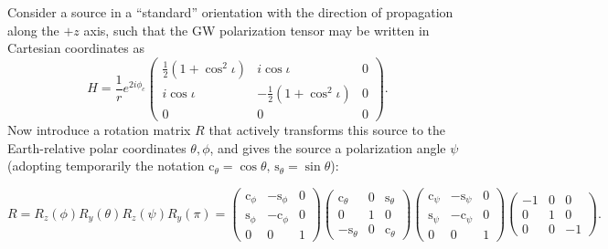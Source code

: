 \documentclass[amsmath,amssymb,aps,prx,reprint,nopreprintnumbers,nofootinbib,showpacs]{revtex4-1}
\begin{document}
Consider a source in a ``standard'' orientation with the direction of propagation along the $+z$ axis, such that the \ac{GW} polarization tensor may be written in Cartesian coordinates as
%
\begin{equation}
    H = \frac{1}{r} e^{2 i \phi_c} \left(
    \begin{array}{ccc}
        \frac{1}{2}(1 + \cos^2 \iota) & i \cos\iota & 0 \\
        i \cos\iota & -\frac{1}{2}(1 + \cos^2 \iota) & 0 \\
        0 & 0 & 0
    \end{array}
    \right).
\end{equation}
%
Now introduce a rotation matrix $R$ that actively transforms this source to the Earth-relative polar coordinates $\theta, \phi$, and gives the source a polarization angle $\psi$ (adopting temporarily the notation $\mathrm{c}_\theta = \cos\theta,\,\mathrm{s}_\theta = \sin\theta$):
%
\begin{widetext}
\begin{equation}
    R = R_z(\phi) R_y(\theta) R_z(\psi) R_y(\pi)
    = \left(
        \begin{array}{ccc}
            \mathrm{c}_\phi & -\mathrm{s}_\phi & 0 \\
            \mathrm{s}_\phi & -\mathrm{c}_\phi & 0 \\
            0 & 0 & 1
        \end{array}
    \right)
    \left(
        \begin{array}{ccc}
            \mathrm{c}_\theta & 0 & \mathrm{s}_\theta \\
            0 & 1 & 0 \\
            -\mathrm{s}_\theta & 0 & \mathrm{c}_\theta
        \end{array}
    \right)
    \left(
        \begin{array}{ccc}
            \mathrm{c}_\psi & -\mathrm{s}_\psi & 0 \\
            \mathrm{s}_\psi & -\mathrm{c}_\psi & 0 \\
            0 & 0 & 1
        \end{array}
    \right)
    \left(
        \begin{array}{ccc}
            -1 & 0 & 0 \\
            0 & 1 & 0 \\
            0 & 0 & -1
        \end{array}
    \right).
\end{equation}
\end{widetext}
\end{document}
